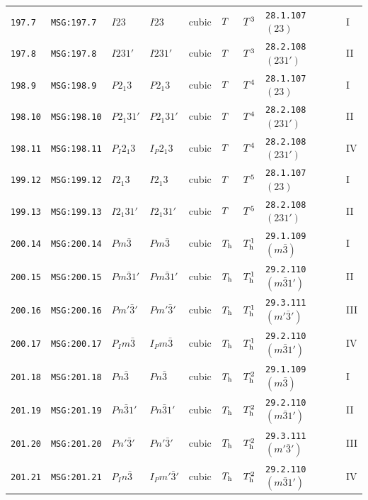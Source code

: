 \documentclass[fleqn,10pt]{jsarticle}
\begin{document}
\begin{center}
\begin{longtable}{lllllllll}
\texttt{197.7} & \texttt{MSG:197.7} & $I23$ & $I23$ & cubic & $T_{\rm }$ & $T_{\rm }^{3}$ & \texttt{28.1.107} $(23)$ & I \\
\texttt{197.8} & \texttt{MSG:197.8} & $I231'$ & $I231'$ & cubic & $T_{\rm }$ & $T_{\rm }^{3}$ & \texttt{28.2.108} $(231')$ & II \\ \hline
\texttt{198.9} & \texttt{MSG:198.9} & $P2_{1}3$ & $P2_{1}3$ & cubic & $T_{\rm }$ & $T_{\rm }^{4}$ & \texttt{28.1.107} $(23)$ & I \\
\texttt{198.10} & \texttt{MSG:198.10} & $P2_{1}31'$ & $P2_{1}31'$ & cubic & $T_{\rm }$ & $T_{\rm }^{4}$ & \texttt{28.2.108} $(231')$ & II \\
\texttt{198.11} & \texttt{MSG:198.11} & $P_{I}2_{1}3$ & $I_{P}2_{1}3$ & cubic & $T_{\rm }$ & $T_{\rm }^{4}$ & \texttt{28.2.108} $(231')$ & IV \\ \hline
\texttt{199.12} & \texttt{MSG:199.12} & $I2_{1}3$ & $I2_{1}3$ & cubic & $T_{\rm }$ & $T_{\rm }^{5}$ & \texttt{28.1.107} $(23)$ & I \\
\texttt{199.13} & \texttt{MSG:199.13} & $I2_{1}31'$ & $I2_{1}31'$ & cubic & $T_{\rm }$ & $T_{\rm }^{5}$ & \texttt{28.2.108} $(231')$ & II \\ \hline
\texttt{200.14} & \texttt{MSG:200.14} & $Pm\bar{3}$ & $Pm\bar{3}$ & cubic & $T_{\rm h}$ & $T_{\rm h}^{1}$ & \texttt{29.1.109} $(m\bar{3})$ & I \\
\texttt{200.15} & \texttt{MSG:200.15} & $Pm\bar{3}1'$ & $Pm\bar{3}1'$ & cubic & $T_{\rm h}$ & $T_{\rm h}^{1}$ & \texttt{29.2.110} $(m\bar{3}1')$ & II \\
\texttt{200.16} & \texttt{MSG:200.16} & $Pm'\bar{3}'$ & $Pm'\bar{3}'$ & cubic & $T_{\rm h}$ & $T_{\rm h}^{1}$ & \texttt{29.3.111} $(m'\bar{3}')$ & III \\
\texttt{200.17} & \texttt{MSG:200.17} & $P_{I}m\bar{3}$ & $I_{P}m\bar{3}$ & cubic & $T_{\rm h}$ & $T_{\rm h}^{1}$ & \texttt{29.2.110} $(m\bar{3}1')$ & IV \\ \hline
\texttt{201.18} & \texttt{MSG:201.18} & $Pn\bar{3}$ & $Pn\bar{3}$ & cubic & $T_{\rm h}$ & $T_{\rm h}^{2}$ & \texttt{29.1.109} $(m\bar{3})$ & I \\
\texttt{201.19} & \texttt{MSG:201.19} & $Pn\bar{3}1'$ & $Pn\bar{3}1'$ & cubic & $T_{\rm h}$ & $T_{\rm h}^{2}$ & \texttt{29.2.110} $(m\bar{3}1')$ & II \\
\texttt{201.20} & \texttt{MSG:201.20} & $Pn'\bar{3}'$ & $Pn'\bar{3}'$ & cubic & $T_{\rm h}$ & $T_{\rm h}^{2}$ & \texttt{29.3.111} $(m'\bar{3}')$ & III \\
\texttt{201.21} & \texttt{MSG:201.21} & $P_{I}n\bar{3}$ & $I_{P}m'\bar{3}'$ & cubic & $T_{\rm h}$ & $T_{\rm h}^{2}$ & \texttt{29.2.110} $(m\bar{3}1')$ & IV \\ \hline

\end{longtable}
\end{center}
\end{document}
